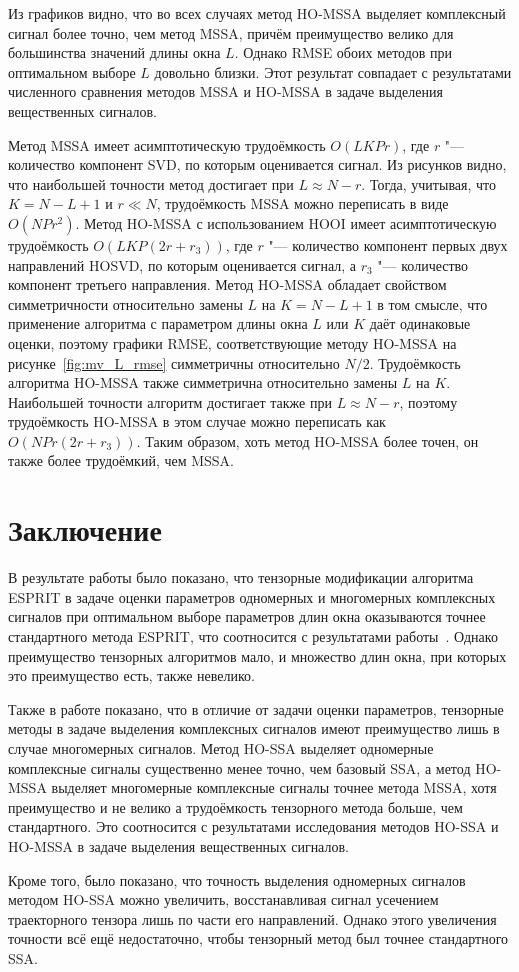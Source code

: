 \documentclass[specialist,
  substylefile=spbu_report.rtx,
subf,href,colorlinks=true, 12pt]{disser}
\theoremstyle{plain}
\theoremstyle{definition}
\theoremstyle{remark}
\begin{document}
Из графиков видно, что во всех случаях метод HO-MSSA выделяет
комплексный сигнал более точно, чем метод MSSA,
причём преимущество велико для большинства значений длины окна $L$.
Однако RMSE обоих методов при оптимальном выборе $L$ довольно близки.
Этот результат совпадает с результатами численного сравнения методов MSSA и
HO-MSSA в задаче выделения вещественных сигналов.

Метод MSSA имеет асимптотическую трудоёмкость $O(LKPr)$, где
$r$ "--- количество компонент SVD, по которым оценивается сигнал.
Из рисунков видно, что наибольшей точности метод достигает при
$L \approx N-r$.
Тогда, учитывая, что $K=N - L + 1$ и $r\ll N$, трудоёмкость MSSA
можно переписать в виде $O(NPr^2)$.
Метод HO-MSSA с использованием HOOI имеет асимптотическую
трудоёмкость $O(LKP(2r+r_3))$, где $r$ "--- количество
компонент первых двух направлений HOSVD,
по которым оценивается сигнал, а $r_3$ "--- количество компонент
третьего направления.
Метод HO-MSSA обладает свойством симметричности относительно
замены $L$ на $K=N-L+1$ в том смысле, что применение алгоритма
с параметром длины окна $L$ или $K$ даёт одинаковые оценки,
поэтому графики RMSE, соответствующие методу HO-MSSA
на рисунке~\ref{fig:mv_L_rmse} симметричны относительно $N/2$.
Трудоёмкость алгоритма HO-MSSA также симметрична относительно
замены $L$ на $K$.
Наибольшей точности алгоритм достигает также при
$L\approx N - r$, поэтому трудоёмкость HO-MSSA в этом случае можно переписать
как $O(NPr(2r+r_3))$.
Таким образом, хоть метод HO-MSSA более точен, он также более
трудоёмкий, чем MSSA.

\newpage

\section{Заключение}\label{sec:conclusion}
В результате работы было показано, что тензорные модификации
алгоритма \linebreak
ESPRIT в задаче оценки параметров одномерных и многомерных
комплексных сигналов при оптимальном выборе параметров
длин окна оказываются точнее стандартного метода ESPRIT,
что соотносится с результатами работы~\cite{hosvd-hooi-separation}.
Однако преимущество тензорных алгоритмов мало, и множество
длин окна, при которых это преимущество есть, также невелико.

Также в работе показано, что в отличие от задачи
оценки параметров, тензорные методы в задаче выделения комплексных
сигналов имеют преимущество лишь в случае многомерных сигналов.
Метод HO-SSA выделяет одномерные комплексные сигналы существенно менее точно,
чем базовый SSA, а метод HO-MSSA выделяет многомерные комплексные сигналы
точнее метода MSSA, хотя преимущество и не велико а трудоёмкость тензорного
метода больше, чем стандартного.
Это соотносится с результатами исследования методов HO-SSA и
HO-MSSA в задаче выделения вещественных сигналов.

Кроме того, было показано, что точность выделения
одномерных сигналов методом HO-SSA можно увеличить, восстанавливая
сигнал усечением траекторного тензора лишь по части его направлений.
Однако этого увеличения точности всё ещё недостаточно, чтобы
тензорный метод был точнее стандартного SSA.



\end{document}
